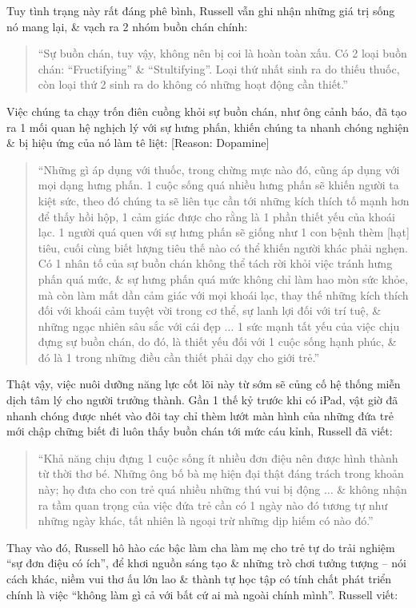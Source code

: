 \documentclass{article}
\begin{document}
\begin{enumerate}
\begin{quote}
	\end{quote}
	Tuy tình trạng này rất đáng phê bình, {\sc Russell} vẫn ghi nhận những giá trị sống nó mang lại, \& vạch ra 2 nhóm buồn chán chính:
	\begin{quote}
		``Sự buồn chán, tuy vậy, không nên bị coi là hoàn toàn xấu. Có 2 loại buồn chán: ``Fructifying'' \& ``Stultifying''. Loại thứ nhất sinh ra do thiếu thuốc, còn loại thứ 2 sinh ra do không có những hoạt động cần thiết.''
	\end{quote}
	Việc chúng ta chạy trốn điên cuồng khỏi sự buồn chán, như ông cảnh báo, đã tạo ra 1 mối quan hệ nghịch lý với sự hưng phấn, khiến chúng ta nhanh chóng nghiện \& bị hiệu ứng của nó làm tê liệt: [Reason: Dopamine]
	\begin{quote}
		``Những gì áp dụng với thuốc, trong chừng mực nào đó, cũng áp dụng với mọi dạng hưng phấn. 1 cuộc sống quá nhiều hưng phấn sẽ khiến người ta kiệt sức, theo đó chúng ta sẽ liên tục cần tới những kích thích tố mạnh hơn để thấy hồi hộp, 1 cảm giác được cho rằng là 1 phần thiết yếu của khoái lạc. 1 người quá quen với sự hưng phấn sẽ giống như 1 con bệnh thèm [hạt] tiêu, cuối cùng biết lượng tiêu thế nào có thể khiến người khác phải nghẹn. Có 1 nhân tố của sự buồn chán không thể tách rời khỏi việc tránh hưng phấn quá mức, \& sự hưng phấn quá mức không chỉ làm hao mòn sức khỏe, mà còn làm mất dần cảm giác với mọi khoái lạc, thay thế những kích thích đối với khoái cảm tuyệt vời trong cơ thể, sự lanh lợi đối với trí tuệ, \& những ngạc nhiên sâu sắc với cái đẹp $\ldots$ 1 sức mạnh tất yếu của việc chịu đựng sự buồn chán, do đó, là thiết yếu đối với 1 cuộc sống hạnh phúc, \& đó là 1 trong những điều cần thiết phải dạy cho giới trẻ.''
	\end{quote}
	Thật vậy, việc nuôi dưỡng năng lực cốt lõi này từ sớm sẽ củng cố hệ thống miễn dịch tâm lý cho người trưởng thành. Gần 1 thế kỷ trước khi có iPad, vật giờ đã nhanh chóng được nhét vào đôi tay chỉ thèm lướt màn hình của những đứa trẻ mới chập chững biết đi luôn thấy buồn chán tới mức cáu kỉnh, {\sc Russell} đã viết:
	\begin{quote}
		``Khả năng chịu đựng 1 cuộc sống ít nhiều đơn điệu nên được hình thành từ thời thơ bé. Những ông bố bà mẹ hiện đại thật đáng trách trong khoản này; họ đưa cho con trẻ quá nhiều những thú vui bị động $\ldots$ \& không nhận ra tầm quan trọng của việc đứa trẻ cần có 1 ngày nào đó tương tự như những ngày khác, tất nhiên là ngoại trừ những dịp hiếm có nào đó.''
	\end{quote}
	Thay vào đó, {\sc Russell} hô hào các bậc làm cha làm mẹ cho trẻ tự do trải nghiệm ``sự đơn điệu có ích'', để khơi nguồn sáng tạo \& những trò chơi tưởng tượng -- nói cách khác, niềm vui thơ ấu lớn lao \& thành tự học tập có tính chất phát triển chính là việc ``không làm gì cả với bất cứ ai mà ngoài chính mình''. {\sc Russell} viết:

\end{enumerate}
\end{document}
